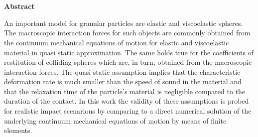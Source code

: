 %
% 

\chapter*{\ }


\vspace{0.75em}

\vspace{2em}
\begin{center}
	\begin{large}
		\textbf{Abstract}
	\end{large}
\end{center}
\vspace{0.75em}

An important model for granular particles are elastic and viscoelastic spheres. The macroscopic interaction forces for such objects are commonly obtained from the continuum mechanical equations of motion for elastic and viscoelastic material in quasi static approximation. The same holds true for the coefficients of restitution of colliding spheres which are, in turn, obtained from the macroscopic interaction forces. The quasi static assumption implies that the characteristic deformation rate is much smaller than the speed of sound in the material and that the relaxation time of the particle's material is negligible compared to the duration of the contact.  In this work the validity of these assumptions is probed for realistic impact scenarious by comparing to a direct numerical solution of the underlying continuum mechanical equations of motion by means of finite elements.   
